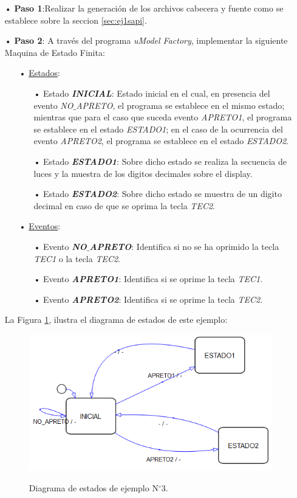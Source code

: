\documentclass[12pt,letterpaper]{article}
\begin{document}
\begin{enumerate}
\item[•]\textbf{Paso 1}:Realizar la generación de los archivos cabecera y fuente como se establece sobre la seccion \ref{sec:ej1sapi}.

\item[•]\textbf{Paso 2}: A través del programa \textit{uModel Factory}, implementar la siguiente Maquina de Estado Finita:

\begin{enumerate}
\item[•]\underline{Estados}:
\begin{enumerate}
\item[•]Estado \textit{\textbf{INICIAL}}: Estado inicial en el cual, en presencia del evento \textit{NO$\_$APRETO}, el programa se establece en el mismo estado; mientras que para el caso que suceda evento \textit{APRETO1}, el programa se establece en el estado \textit{ESTADO1}; en el caso de la ocurrencia del evento \textit{APRETO2}, el programa se establece en el estado \textit{ESTADO2}. 
\item[•]Estado \textit{\textbf{ESTADO1}}: Sobre dicho estado se realiza la secuencia de luces y la muestra de los digitos decimales sobre el display.
\item[•]Estado \textit{\textbf{ESTADO2}}: Sobre dicho estado se muestra de un digito decimal en caso de que se oprima la tecla \textit{TEC2}.
\end{enumerate}
\item[•]\underline{Eventos}:
\begin{enumerate}
\item[•]Evento \textit{\textbf{NO$\_$APRETO}}: Identifica si no se ha oprimido la tecla \textit{TEC1} o la tecla \textit{TEC2}.
\item[•]Evento \textit{\textbf{APRETO1}}: Identifica si se oprime la tecla \textit{TEC1}.
\item[•]Evento \textit{\textbf{APRETO2}}: Identifica si se oprime la tecla \textit{TEC2}.
\end{enumerate}
\end{enumerate}
La Figura \ref{Fig27}, ilustra el diagrama de estados de este ejemplo:


\begin{figure}[H]
\centering
\includegraphics[width=6 cm]{figuras/f9.png}\\
\caption{Diagrama de estados de ejemplo N$^{\circ}$3.}
\label{Fig27}
\end{figure}


\end{enumerate}
\end{document}
